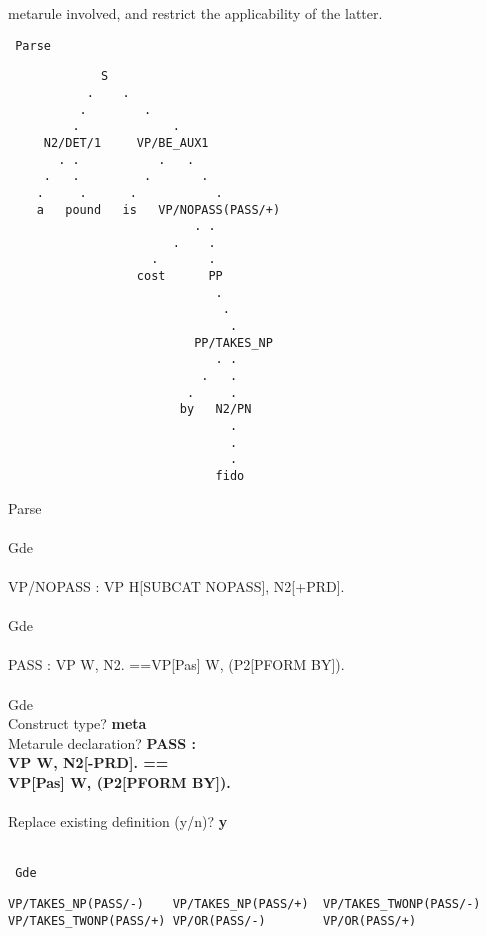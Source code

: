 metarule involved, and restrict the applicability of the latter.
\begin{display}
{\small\tt
Parse\ran{}
\begin{verbatim}
             S
           .    .
          .        .
         .             .
     N2/DET/1     VP/BE_AUX1
       . .           .   .
     .   .         .       .
    .     .      .           .
    a   pound   is   VP/NOPASS(PASS/+)
                          . .
                       .    .
                    .       .
                  cost      PP
                             .
                              .
                               .
                          PP/TAKES_NP
                             . .
                           .   .
                         .     .
                        by   N2/PN
                               .
                               .
                               .
                             fido

\end{verbatim}
Parse\ran{}\\
\\
Gde\\
\\
VP/NOPASS : VP \twodash\ra H[SUBCAT NOPASS], N2[+PRD].\\
\\
Gde\\
\\
PASS : VP \twodash\ra W, N2. ==\ra VP[Pas] \twodash\ra W, (P2[PFORM BY]).\\
\\
Gde\\
Construct type? {\bf meta}\\
Metarule declaration? {\bf PASS :\\
\ra VP \twodash\ra W, N2[-PRD]. ==\ra\\
\ra   VP[Pas] \twodash\ra W, (P2[PFORM BY]).}\\
\\
Replace existing definition (y/n)? {\bf y}\\
\\
} \end{display}
\begin{display}
{\small\tt
Gde
\begin{verbatim}
VP/TAKES_NP(PASS/-)    VP/TAKES_NP(PASS/+)  VP/TAKES_TWONP(PASS/-)
VP/TAKES_TWONP(PASS/+) VP/OR(PASS/-)        VP/OR(PASS/+)

\end{verbatim}
} \end{display}
